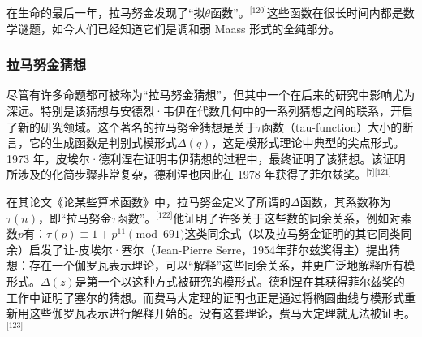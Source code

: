 在生命的最后一年，拉马努金发现了“拟$\theta$函数”。\(^\text{[120]}\)这些函数在很长时间内都是数学谜题，如今人们已经知道它们是调和弱 Maass 形式的全纯部分。
\subsubsection{拉马努金猜想}
尽管有许多命题都可被称为“拉马努金猜想”，但其中一个在后来的研究中影响尤为深远。特别是该猜想与安德烈·韦伊在代数几何中的一系列猜想之间的联系，开启了新的研究领域。这个著名的拉马努金猜想是关于$\tau$函数（tau-function）大小的断言，它的生成函数是判别式模形式$\Delta(q)$，这是模形式理论中典型的尖点形式。1973 年，皮埃尔·德利涅在证明韦伊猜想的过程中，最终证明了该猜想。该证明所涉及的化简步骤非常复杂，德利涅也因此在 1978 年获得了菲尔兹奖。\(^\text{[7][121]}\)

在其论文《论某些算术函数》中，拉马努金定义了所谓的$\Delta$函数，其系数称为$\tau(n)$，即“拉马努金$\tau$函数”。\(^\text{[122]}\)他证明了许多关于这些数的同余关系，例如对素数$p$有：$\tau(p) \equiv 1 + p^{11} \pmod{691}$这类同余式（以及拉马努金证明的其它同类同余）启发了让-皮埃尔·塞尔（Jean-Pierre Serre，1954年菲尔兹奖得主）提出猜想：存在一个伽罗瓦表示理论，可以“解释”这些同余关系，并更广泛地解释所有模形式。$\Delta(z)$是第一个以这种方式被研究的模形式。德利涅在其获得菲尔兹奖的工作中证明了塞尔的猜想。而费马大定理的证明也正是通过将椭圆曲线与模形式重新用这些伽罗瓦表示进行解释开始的。没有这套理论，费马大定理就无法被证明。\(^\text{[123]}\)
